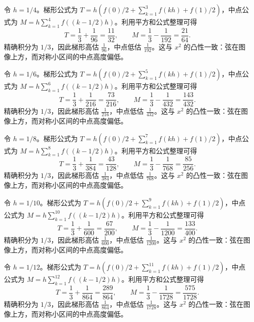 \documentclass[UTF8,12pt,a4paper,fontset=fandol]{ctexart}
\begin{document}
\begin{solve}\label{ans:c18q2}
令 $h=1/4$。梯形公式为 $T=h(f(0)/2+\sum_{k=1}^{3}f(kh)+f(1)/2)$，中点公式为 $M=h\sum_{k=1}^{4}f((k-1/2)h)$。利用平方和公式整理可得
\[
T=\frac13+\frac1{96}=\frac{11}{32},\qquad M=\frac13-\frac1{192}=\frac{21}{64}.
\]
精确积分为 $1/3$，因此梯形高估 $\frac{1}{96}$，中点低估 $\frac{1}{192}$。这与 $x^2$ 的凸性一致：弦在图像上方，而对称小区间的中点高度偏低。
\end{solve}

\begin{solve}\label{ans:c18q3}
令 $h=1/6$。梯形公式为 $T=h(f(0)/2+\sum_{k=1}^{5}f(kh)+f(1)/2)$，中点公式为 $M=h\sum_{k=1}^{6}f((k-1/2)h)$。利用平方和公式整理可得
\[
T=\frac13+\frac1{216}=\frac{73}{216},\qquad M=\frac13-\frac1{432}=\frac{143}{432}.
\]
精确积分为 $1/3$，因此梯形高估 $\frac{1}{216}$，中点低估 $\frac{1}{432}$。这与 $x^2$ 的凸性一致：弦在图像上方，而对称小区间的中点高度偏低。
\end{solve}

\begin{solve}\label{ans:c18q4}
令 $h=1/8$。梯形公式为 $T=h(f(0)/2+\sum_{k=1}^{7}f(kh)+f(1)/2)$，中点公式为 $M=h\sum_{k=1}^{8}f((k-1/2)h)$。利用平方和公式整理可得
\[
T=\frac13+\frac1{384}=\frac{43}{128},\qquad M=\frac13-\frac1{768}=\frac{85}{256}.
\]
精确积分为 $1/3$，因此梯形高估 $\frac{1}{384}$，中点低估 $\frac{1}{768}$。这与 $x^2$ 的凸性一致：弦在图像上方，而对称小区间的中点高度偏低。
\end{solve}

\begin{solve}\label{ans:c18q5}
令 $h=1/10$。梯形公式为 $T=h(f(0)/2+\sum_{k=1}^{9}f(kh)+f(1)/2)$，中点公式为 $M=h\sum_{k=1}^{10}f((k-1/2)h)$。利用平方和公式整理可得
\[
T=\frac13+\frac1{600}=\frac{67}{200},\qquad M=\frac13-\frac1{1200}=\frac{133}{400}.
\]
精确积分为 $1/3$，因此梯形高估 $\frac{1}{600}$，中点低估 $\frac{1}{1200}$。这与 $x^2$ 的凸性一致：弦在图像上方，而对称小区间的中点高度偏低。
\end{solve}

\begin{solve}\label{ans:c18q6}
令 $h=1/12$。梯形公式为 $T=h(f(0)/2+\sum_{k=1}^{11}f(kh)+f(1)/2)$，中点公式为 $M=h\sum_{k=1}^{12}f((k-1/2)h)$。利用平方和公式整理可得
\[
T=\frac13+\frac1{864}=\frac{289}{864},\qquad M=\frac13-\frac1{1728}=\frac{575}{1728}.
\]
精确积分为 $1/3$，因此梯形高估 $\frac{1}{864}$，中点低估 $\frac{1}{1728}$。这与 $x^2$ 的凸性一致：弦在图像上方，而对称小区间的中点高度偏低。
\end{solve}
\end{document}
